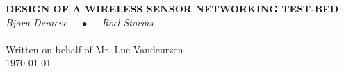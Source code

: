 \documentclass[10pt, a4paper, oneside]{Thesis} %
\begin{document}

\thispagestyle{empty}
\null\vfill 

\begin{center}
\Large{\textbf{DESIGN OF A WIRELESS SENSOR NETWORKING TEST-BED}}\\
\vspace{3cm}
\large{\emph{Bjorn Deraeve $\quad\bullet\quad$ Roel Storms}} \\
\HRule \\[1.0cm]
\vspace{1cm}
\normalsize{Written on behalf of Mr. Luc Vandeurzen}\\
\vspace{12cm}
{\large \today}
\end{center}

\vfill\vfill\vfill\vfill\

\clearpage %




\end{document}
